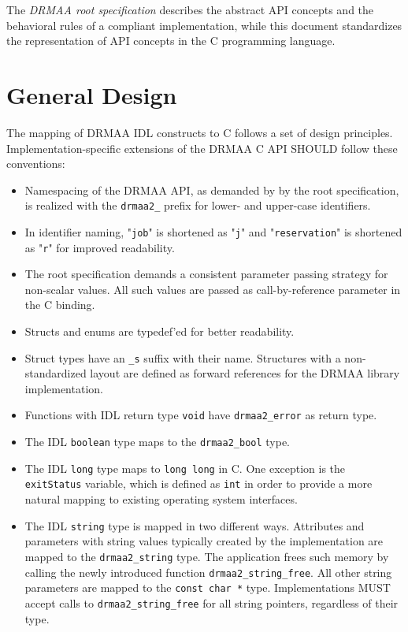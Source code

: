 \documentclass{article}
\newcommand{\h}[1]{\texttt{#1}}
\newcommand{\rat}[1]{}
\begin{document}
The \emph{DRMAA root specification} \cite{gfd194} describes the abstract API concepts and the behavioral rules of a compliant implementation, while this document standardizes the representation of API concepts in the C programming language.

\section{General Design}
\label{sec:concepts}

The mapping of DRMAA IDL constructs to C follows a set of design principles. Implementation-specific extensions of the DRMAA C API SHOULD follow these conventions:

\begin{itemize}
\item Namespacing of the DRMAA API, as demanded by by the root specification, is realized with the \h{drmaa2\_} prefix for lower- and upper-case identifiers.
\item In identifier naming, "\h{job}" is shortened as "\h{j}" and "\h{reservation}" is shortened as "\h{r}" for improved readability.
\item The root specification demands a consistent parameter passing strategy for non-scalar values. All such values are passed as call-by-reference parameter in the C binding.
\item Structs and enums are typedef'ed for better readability.
\item Struct types have an \h{\_s} suffix with their name. Structures with a non-standardized layout are defined as forward references for the DRMAA library implementation. \rat{This avoids the usage of void* pointers, f.e. with dictionaries and lists.} 
\item Functions with IDL return type \h{void} have \h{drmaa2\_error} as return type.
\item The IDL \h{boolean} type maps to the \h{drmaa2\_bool} type.
\item The IDL  \h{long} type maps to \h{long long} in C. One exception is the \h{exitStatus} variable, which is defined as \h{int} in order to provide a more natural mapping to existing operating system interfaces.
\item The IDL \h{string} type is mapped in two different ways. Attributes and parameters with string values typically created by the implementation are mapped to the \h{drmaa2\_string} type. The application frees such memory by calling the newly introduced function \h{drmaa2\_string\_free}. All other string parameters are mapped to the \h{const char *} type. Implementations MUST accept calls to \h{drmaa2\_string\_free} for all string pointers, regardless of their type. \rat{This means that even if the implementation returns string literal pointers at some occasions, \h{drmaa2\_string\_free} SHALL not fail for this. This may be realized by avoiding string literal pointers at all, or by maintaining a list of malloced pointers.}  

\end{itemize}
\end{document}
